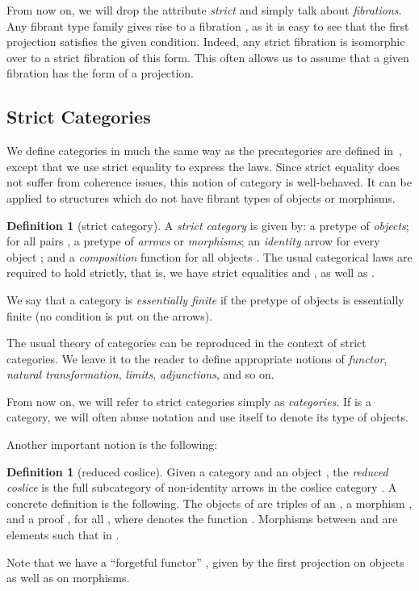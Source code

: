 \documentclass[a4paper,reqno]{amsart}
\newcommand{\C}{\mathcal{C}}
\theoremstyle{plain}
\theoremstyle{definition}
\newtheorem{definition}[theorem]{Definition}
\begin{document}
From now on, we will drop the attribute \emph{strict} and simply talk about \emph{fibrations}.
Any fibrant type family  gives rise to a fibration , 
as it is easy to see that the first projection  satisfies the given condition.
Indeed, any strict fibration is isomorphic over  to a strict fibration of this form.
This often allows us to assume that a given fibration has the form of a projection.


\subsection{Strict Categories}

We define categories in much the same way as the precategories are defined in~\cite{HoTTbook}, except that we
use strict equality to express the laws. 
Since strict equality does not suffer from coherence issues, this notion of category is well-behaved. 
It can be applied to structures which do not have fibrant types of objects or morphisms.

\renewcommand{\C}{\mathcal C}
\let\seq\steq 
\newcommand{\obj}[1]{\vert #1 \vert}

\begin{definition}[strict category] \label{def:strictcat}
A \emph{strict category}  is given by: a pretype  of \emph{objects};
for all pairs , a pretype  of \emph{arrows}
or \emph{morphisms};
an \emph{identity} arrow 
 for every object ; and a \emph{composition} function
 for all objects .
The usual categorical laws are required to hold strictly, that is, 
we have strict equalities  and , as well as .

We say that a category is \emph{essentially finite} if the pretype of objects  is essentially finite (no condition is put on the arrows).
\end{definition}

The usual theory of categories can be reproduced in the context of strict
categories.  We leave it to the reader to define appropriate notions of \emph{functor},
\emph{natural transformation}, \emph{limits}, \emph{adjunctions}, and so on.

From now on, we will refer to strict categories simply as \emph{categories}. If
 is a category, we will often abuse notation and use  itself to denote
its type of objects.

Another important notion is the following:
\begin{definition}[reduced coslice]
Given a category  and an object , the \emph{reduced coslice}
 is the full subcategory of non-identity arrows in the coslice
category . 
A concrete definition is the following.
The objects of  are triples 
of an , a morphism , and a proof , for all ,
where  denotes the  function .
Morphisms between  and  are elements  such that  in .

Note that we have a ``forgetful functor'' , given by the first projection on objects as well as on morphisms.
\end{definition}
\end{document}
